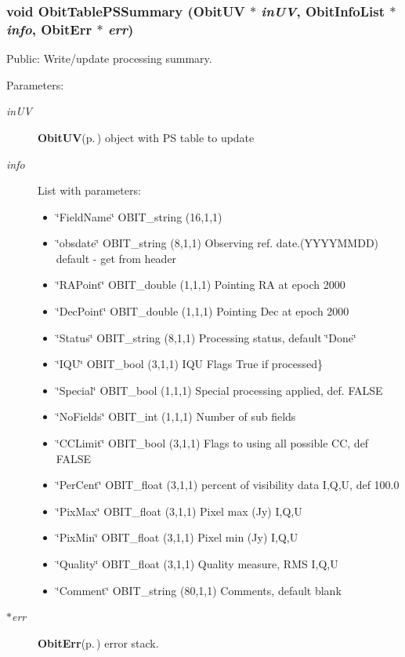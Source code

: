 \subsubsection{\setlength{\rightskip}{0pt plus 5cm}void Obit\-Table\-PSSummary ({\bf Obit\-UV} $\ast$ {\em in\-UV}, {\bf Obit\-Info\-List} $\ast$ {\em info}, {\bf Obit\-Err} $\ast$ {\em err})}\label{ObitTablePSUtil_8h_a1}


Public: Write/update processing summary. 

\begin{Desc}
\item[Parameters:]
\begin{description}
\item[{\em in\-UV}]{\bf Obit\-UV}{\rm (p.\,\pageref{structObitUV})} object with PS table to update \item[{\em info}]List with parameters: \begin{itemize}
\item \char`\"{}Field\-Name\char`\"{} OBIT\_\-string (16,1,1) \item \char`\"{}obsdate\char`\"{} OBIT\_\-string (8,1,1) Observing ref. date.(YYYYMMDD) default - get from header \item \char`\"{}RAPoint\char`\"{} OBIT\_\-double (1,1,1) Pointing RA at epoch 2000 \item \char`\"{}Dec\-Point\char`\"{} OBIT\_\-double (1,1,1) Pointing Dec at epoch 2000 \item \char`\"{}Status\char`\"{} OBIT\_\-string (8,1,1) Processing status, default \char`\"{}Done\char`\"{} \item \char`\"{}IQU\char`\"{} OBIT\_\-bool (3,1,1) IQU Flags True if processed\} \item \char`\"{}Special\char`\"{} OBIT\_\-bool (1,1,1) Special processing applied, def. FALSE \item \char`\"{}No\-Fields\char`\"{} OBIT\_\-int (1,1,1) Number of sub fields \item \char`\"{}CCLimit\char`\"{} OBIT\_\-bool (3,1,1) Flags to using all possible CC, def FALSE \item \char`\"{}Per\-Cent\char`\"{} OBIT\_\-float (3,1,1) percent of visibility data I,Q,U, def 100.0 \item \char`\"{}Pix\-Max\char`\"{} OBIT\_\-float (3,1,1) Pixel max (Jy) I,Q,U \item \char`\"{}Pix\-Min\char`\"{} OBIT\_\-float (3,1,1) Pixel min (Jy) I,Q,U \item \char`\"{}Quality\char`\"{} OBIT\_\-float (3,1,1) Quality measure, RMS I,Q,U \item \char`\"{}Comment\char`\"{} OBIT\_\-string (80,1,1) Comments, default blank \end{itemize}
\item[{\em $\ast$err}]{\bf Obit\-Err}{\rm (p.\,\pageref{structObitErr})} error stack. \end{description}
\end{Desc}
